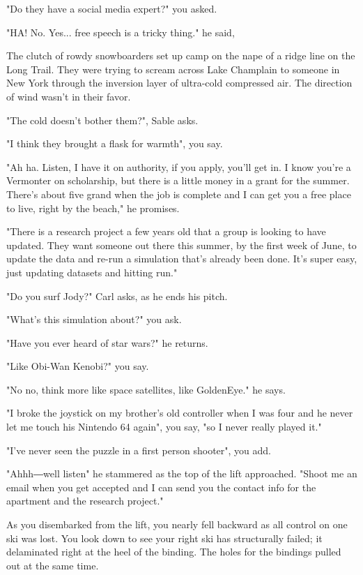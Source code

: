 \documentclass[a5paper, symmetric]{tufte-book}
\begin{document}
"Do they have a social media expert?" you asked. 

"HA! No. Yes... free speech is a tricky thing." he said,

The clutch of rowdy snowboarders set up camp on the nape of a ridge line on the Long Trail. They were trying to scream across Lake Champlain to someone in New York through the inversion layer of ultra-cold compressed air. The direction of wind wasn't in their favor.

"The cold doesn't bother them?", Sable asks. 

"I think they brought a flask for warmth", you say. 

"Ah ha. Listen, I have it on authority, if you apply, you'll get in. I know you're a Vermonter on scholarship, but there is a little money in a grant for the summer. There's about five grand when the job is complete and I can get you a free place to live, right by the beach," he promises. 

"There is a research project a few years old that a group is looking to have updated. They want someone out there this summer, by the first week of June, to update the data and re-run a simulation that's already been done. It's super easy, just updating datasets and hitting run." 

"Do you surf Jody?" Carl asks, as he ends his pitch. 

"What's this simulation about?" you ask. 

"Have you ever heard of star wars?" he returns.

"Like Obi-Wan Kenobi?" you say.

"No no, think more like space satellites, like GoldenEye." he says.

"I broke the joystick on my brother's old controller when I was four and he never let me touch his Nintendo 64 again", you say, "so I never really played it."

"I've never seen the puzzle in a first person shooter", you add.

"Ahhh―well listen" he stammered as the top of the lift approached. "Shoot me an email when you get accepted and I can send you the contact info for the apartment and the research project." 

As you disembarked from the lift, you nearly fell backward as all control on one ski was lost. You look down to see your right ski has structurally failed; it delaminated right at the heel of the binding. The holes for the bindings pulled out at the same time.
\end{document}
